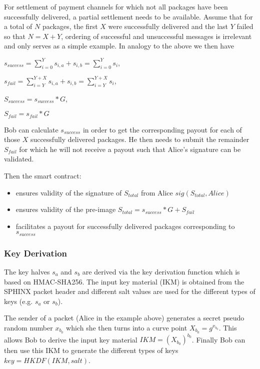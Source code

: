 \documentclass{article}
\newcommand{\MYhref}[3][blue]{\href{#2}{\color{#1}{#3}}}%
\begin{document}
For settlement of payment channels for which not all packages have been successfully delivered, a partial settlement needs to be available. Assume that for a total of $N$ packages, the first $X$ were successfully delivered and the last $Y$ failed so that $N = X + Y$, ordering of successful and unsuccessful messages is irrelevant and only serves as a simple example. In analogy to the above we then have

$s_{success} = \sum_{i=0}^{Y} s_{i,a} + s_{i,b} = \sum_{i=0}^{Y} s_i$,

$s_{fail} = \sum_{i=Y}^{Y+X} s_{i,a} + s_{i,b} = \sum_{i=Y}^{Y+X} s_i$,

$S_{success} = s_{success} * G$,

$S_{fail} = s_{fail} * G$

Bob can calculate $s_{success}$ in order to get the corresponding payout for each of those $X$ successfully delivered packages. He then needs to submit the remainder $S_{fail}$ for which he will not receive a payout such that Alice's signature can be validated.

Then the smart contract:
\begin{itemize}
    \item ensures validity of the signature of $S_{total}$ from Alice $sig(S_{total}, Alice)$
    \item ensures validity of the pre-image $S_{total} = s_{success} * G + S_{fail}$
    \item facilitates a payout for successfully delivered packages corresponding to $s_{success}$
\end{itemize}

\subsubsection{Key Derivation}
The key halves $s_a$ and $s_b$ are derived via the \MYhref{https://en.wikipedia.org/wiki/HKDF}{HKDF} key derivation function which is based on HMAC-SHA256. The input key material (IKM) is obtained from the SPHINX packet header and different salt values are used for the different types of keys (e.g. $s_a$ or $s_b$).

The sender of a packet (Alice in the example above) generates a secret pseudo random number $x_{b_0}$ which she then turns into a curve point $X_{b_0} = g^{x_{b_0}}$. This allows Bob to derive the input key material $IKM = (X_{b_0})^{b_0}$. Finally Bob can then use this IKM to generate the different types of keys $key=HKDF(IKM, salt)$.
\end{document}
